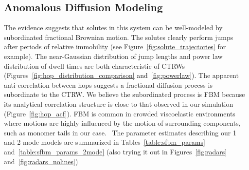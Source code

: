 \documentclass{article}
\begin{document}
%  
%    
  
  \subsection{Anomalous Diffusion Modeling}\label{section:sFBM}

  The evidence suggests that solutes in this system can be well-modeled by subordinated
  fractional Brownian motion. The solutes clearly perform jumps after periods of relative
  immobility (see Figure~\ref{fig:solute_trajectories} for example). The near-Gaussian distribution
  of jump lengths and power law distribution of dwell times are both characteristic of 
  CTRWs (Figures~\ref{fig:hop_distribution_comparison} and~\ref{fig:powerlaw}). The apparent
  anti-correlation between hops suggests a fractional diffusion process is subordinate to the
  CTRW. We believe the subordinated process is FBM because its analytical correlation 
  structure is close to that observed in our simulation (Figure~\ref{fig:hop_acf}). FBM
  is common in crowded viscoelastic environments where motions are highly influenced by
  the motion of surrounding components, such as monomer tails in our case.~\cite{ernst_fractional_2012}
  The parameter estimates describing our 1 and 2 mode models are summarized in 
  Tables~\ref{table:sfbm_params} and~\ref{table:sfbm_params_2mode} (also trying it out in 
  Figures~\ref{fig:radars} and~\ref{fig:radars_nolines})
  
\end{document}
